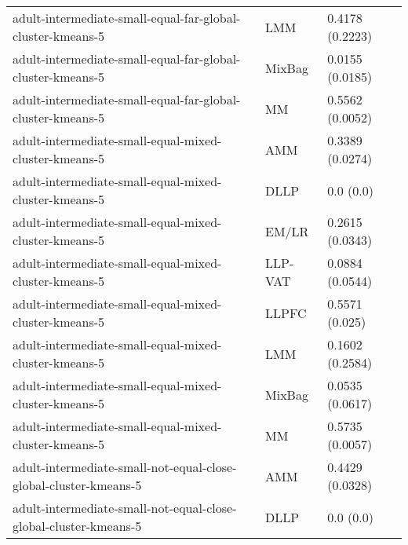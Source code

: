 \begin{longtable}{lll}
                                                   adult-intermediate-small-equal-far-global-cluster-kmeans-5 &       LMM &                       0.4178 (0.2223) \\
                                                   adult-intermediate-small-equal-far-global-cluster-kmeans-5 &    MixBag &                       0.0155 (0.0185) \\
                                                   adult-intermediate-small-equal-far-global-cluster-kmeans-5 &        MM &                       0.5562 (0.0052) \\
                                                        adult-intermediate-small-equal-mixed-cluster-kmeans-5 &       AMM &                       0.3389 (0.0274) \\
                                                        adult-intermediate-small-equal-mixed-cluster-kmeans-5 &      DLLP &                             0.0 (0.0) \\
                                                        adult-intermediate-small-equal-mixed-cluster-kmeans-5 &     EM/LR &                       0.2615 (0.0343) \\
                                                        adult-intermediate-small-equal-mixed-cluster-kmeans-5 &   LLP-VAT &                       0.0884 (0.0544) \\
                                                        adult-intermediate-small-equal-mixed-cluster-kmeans-5 &     LLPFC &                        0.5571 (0.025) \\
                                                        adult-intermediate-small-equal-mixed-cluster-kmeans-5 &       LMM &                       0.1602 (0.2584) \\
                                                        adult-intermediate-small-equal-mixed-cluster-kmeans-5 &    MixBag &                       0.0535 (0.0617) \\
                                                        adult-intermediate-small-equal-mixed-cluster-kmeans-5 &        MM &                       0.5735 (0.0057) \\
                                             adult-intermediate-small-not-equal-close-global-cluster-kmeans-5 &       AMM &                       0.4429 (0.0328) \\
                                             adult-intermediate-small-not-equal-close-global-cluster-kmeans-5 &      DLLP &                             0.0 (0.0) \\

\end{longtable}

